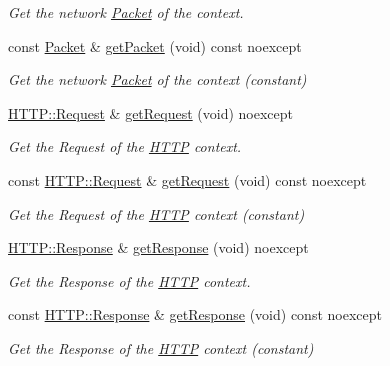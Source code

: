 \begin{DoxyCompactItemize}
\begin{DoxyCompactList}\small\item\em Get the network \mbox{\hyperlink{classo_z_1_1_packet}{Packet}} of the context. \end{DoxyCompactList}\item 
const \mbox{\hyperlink{classo_z_1_1_packet}{Packet}} \& \mbox{\hyperlink{classo_z_1_1_context_a25918977b74de5fc3874d38a2f235ba2}{get\+Packet}} (void) const noexcept
\begin{DoxyCompactList}\small\item\em Get the network \mbox{\hyperlink{classo_z_1_1_packet}{Packet}} of the context (constant) \end{DoxyCompactList}\item 
\mbox{\hyperlink{classo_z_1_1_h_t_t_p_1_1_request}{H\+T\+T\+P\+::\+Request}} \& \mbox{\hyperlink{classo_z_1_1_context_af3d2d70a75f5f637a06ec5205e78758c}{get\+Request}} (void) noexcept
\begin{DoxyCompactList}\small\item\em Get the Request of the \mbox{\hyperlink{namespaceo_z_1_1_h_t_t_p}{H\+T\+TP}} context. \end{DoxyCompactList}\item 
const \mbox{\hyperlink{classo_z_1_1_h_t_t_p_1_1_request}{H\+T\+T\+P\+::\+Request}} \& \mbox{\hyperlink{classo_z_1_1_context_afa1b9ec6afd21b7e620e7fe1f4c14e86}{get\+Request}} (void) const noexcept
\begin{DoxyCompactList}\small\item\em Get the Request of the \mbox{\hyperlink{namespaceo_z_1_1_h_t_t_p}{H\+T\+TP}} context (constant) \end{DoxyCompactList}\item 
\mbox{\hyperlink{classo_z_1_1_h_t_t_p_1_1_response}{H\+T\+T\+P\+::\+Response}} \& \mbox{\hyperlink{classo_z_1_1_context_ab656757ce56d11f39814747f1efe1f86}{get\+Response}} (void) noexcept
\begin{DoxyCompactList}\small\item\em Get the Response of the \mbox{\hyperlink{namespaceo_z_1_1_h_t_t_p}{H\+T\+TP}} context. \end{DoxyCompactList}\item 
const \mbox{\hyperlink{classo_z_1_1_h_t_t_p_1_1_response}{H\+T\+T\+P\+::\+Response}} \& \mbox{\hyperlink{classo_z_1_1_context_aad384e516919b9c4faf5b702b85994af}{get\+Response}} (void) const noexcept
\begin{DoxyCompactList}\small\item\em Get the Response of the \mbox{\hyperlink{namespaceo_z_1_1_h_t_t_p}{H\+T\+TP}} context (constant) \end{DoxyCompactList}\item 

\end{DoxyCompactItemize}
